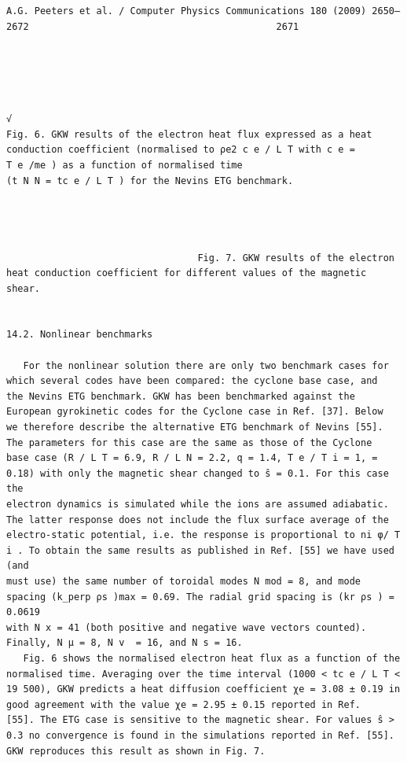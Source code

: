 \documentclass[a4paper]{article}
\newcommand{\gkwpagefont}{\fontsize{6.0pt}{7.55pt}\selectfont}
\begin{document}
\begin{Verbatim}[fontsize=\gkwpagefont]
                                                    A.G. Peeters et al. / Computer Physics Communications 180 (2009) 2650–2672                                            2671




                                                                                                                                 √
Fig. 6. GKW results of the electron heat flux expressed as a heat conduction coefficient (normalised to ρe2 c e / L T with c e =        T e /me ) as a function of normalised time
(t N N = tc e / L T ) for the Nevins ETG benchmark.




                                  Fig. 7. GKW results of the electron heat conduction coefficient for different values of the magnetic shear.


14.2. Nonlinear benchmarks

   For the nonlinear solution there are only two benchmark cases for which several codes have been compared: the cyclone base case, and
the Nevins ETG benchmark. GKW has been benchmarked against the European gyrokinetic codes for the Cyclone case in Ref. [37]. Below
we therefore describe the alternative ETG benchmark of Nevins [55]. The parameters for this case are the same as those of the Cyclone
base case (R / L T = 6.9, R / L N = 2.2, q = 1.4, T e / T i = 1, = 0.18) with only the magnetic shear changed to ŝ = 0.1. For this case the
electron dynamics is simulated while the ions are assumed adiabatic. The latter response does not include the flux surface average of the
electro-static potential, i.e. the response is proportional to ni φ/ T i . To obtain the same results as published in Ref. [55] we have used (and
must use) the same number of toroidal modes N mod = 8, and mode spacing (k_perp ρs )max = 0.69. The radial grid spacing is (kr ρs ) = 0.0619
with N x = 41 (both positive and negative wave vectors counted). Finally, N μ = 8, N v  = 16, and N s = 16.
   Fig. 6 shows the normalised electron heat flux as a function of the normalised time. Averaging over the time interval (1000 < tc e / L T <
19 500), GKW predicts a heat diffusion coefficient χe = 3.08 ± 0.19 in good agreement with the value χe = 2.95 ± 0.15 reported in Ref.
[55]. The ETG case is sensitive to the magnetic shear. For values ŝ > 0.3 no convergence is found in the simulations reported in Ref. [55].
GKW reproduces this result as shown in Fig. 7.


\end{Verbatim}
\end{document}

